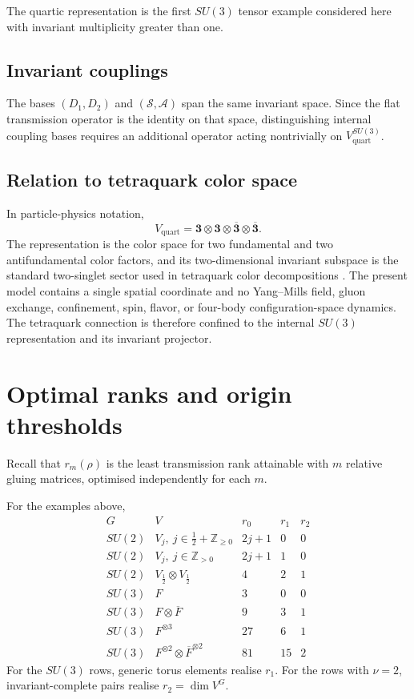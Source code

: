 \documentclass[11pt]{article}
\theoremstyle{plain}
\theoremstyle{definition}
\begin{document}
The quartic representation is the first \(SU(3)\) tensor example considered here with invariant multiplicity greater than one.

\subsection{Invariant couplings}

The bases \((D_1,D_2)\) and \((\mathcal S,\mathcal A)\) span the same invariant space. Since the flat transmission operator is the identity on that space, distinguishing internal coupling bases requires an additional operator acting nontrivially on \(V_{\mathrm{quart}}^{SU(3)}\).

\subsection{Relation to tetraquark color space}

In particle-physics notation,
\[
V_{\mathrm{quart}}
=
\mathbf3\otimes\mathbf3\otimes\overline{\mathbf3}\otimes\overline{\mathbf3}.
\]
The representation is the color space for two fundamental and two antifundamental color factors, and its two-dimensional invariant subspace is the standard two-singlet sector used in tetraquark color decompositions
\citep{Slansky1981,ParkLee2014}. The present model contains a single spatial coordinate and no Yang--Mills field, gluon exchange, confinement, spin, flavor, or four-body configuration-space dynamics. The tetraquark connection is therefore confined to the internal \(SU(3)\) representation and its invariant projector.
\section{Optimal ranks and origin thresholds}
\label{sec:rank-profiles}

Recall that \(r_m(\rho)\) is the least transmission rank attainable with \(m\) relative gluing matrices, optimised independently for each \(m\).

For the examples above,
\[
\begin{array}{c|c|c|c|c}
G
&
V
&
r_0
&
r_1
&
r_2
\\
\hline
SU(2)
&
V_j,\ j\in\frac12+\mathbb Z_{\geq0}
&
2j+1&0&0
\\[1mm]
SU(2)
&
V_j,\ j\in\mathbb Z_{>0}
&
2j+1&1&0
\\[1mm]
SU(2)
&
V_{\frac12}\otimes V_{\frac12}
&
4&2&1
\\[1mm]
SU(3)
&
F
&
3&0&0
\\[1mm]
SU(3)
&
F\otimes\overline F
&
9&3&1
\\[1mm]
SU(3)
&
F^{\otimes3}
&
27&6&1
\\[1mm]
SU(3)
&
F^{\otimes2}\otimes\overline F^{\otimes2}
&
81&15&2
\end{array}
\]
For the \(SU(3)\) rows, generic torus elements realise \(r_1\). For the rows with \(\nu=2\), invariant-complete pairs realise \(r_2=\dim V^G\).
\end{document}
